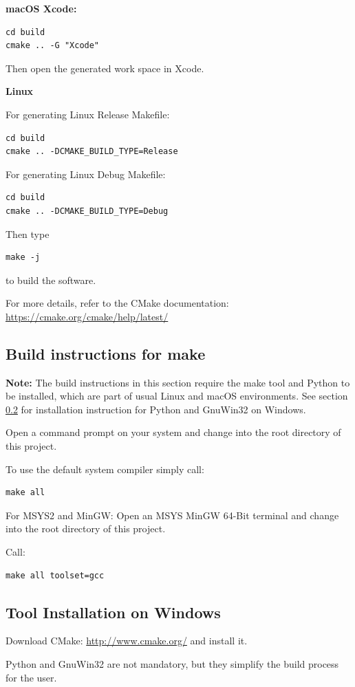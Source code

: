 ﻿\documentclass[a4paper,11pt]{jvetdoc}
\begin{document}
\textbf{macOS Xcode:}
\begin{verbatim}
cd build
cmake .. -G "Xcode"
\end{verbatim}
Then open the generated work space in Xcode.

\textbf{Linux}

For generating Linux Release Makefile:
\begin{verbatim}
cd build
cmake .. -DCMAKE_BUILD_TYPE=Release
\end{verbatim}
For generating Linux Debug Makefile:
\begin{verbatim}
cd build
cmake .. -DCMAKE_BUILD_TYPE=Debug
\end{verbatim}
Then type
\begin{verbatim}
make -j
\end{verbatim}
to build the software.

For more details, refer to the CMake documentation: \url{https://cmake.org/cmake/help/latest/}

\subsection {Build instructions for make}

\textbf{Note:}
The build instructions in this section require the make tool and Python
to be installed, which are part of usual Linux and macOS environments. 
See section \ref{windowsinstall} for installation instruction for Python 
and GnuWin32 on Windows.

Open a command prompt on your system and change into the root directory
of this project.

To use the default system compiler simply call:
\begin{verbatim}
make all
\end{verbatim}
For MSYS2 and MinGW:
Open an MSYS MinGW 64-Bit terminal and change into the root directory
of this project.

Call:
\begin{verbatim}
make all toolset=gcc
\end{verbatim}

\subsection{Tool Installation on Windows}
\label{windowsinstall}

Download CMake: \url{http://www.cmake.org/} and install it.

Python and GnuWin32 are not mandatory, but they simplify the build process for the user.
\end{document}
